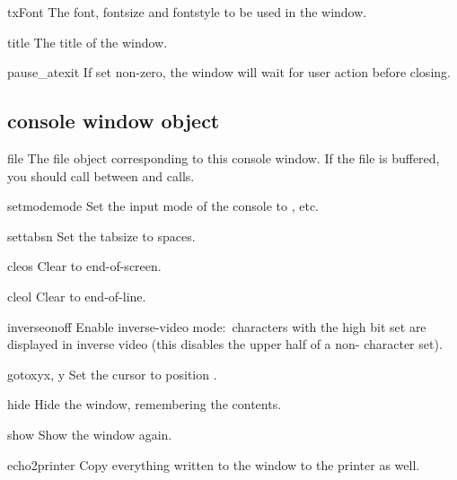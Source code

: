 \begin{datadesc}{txFont}
The font, fontsize and fontstyle to be used in the window.
\end{datadesc}

\begin{datadesc}{title}
The title of the window.
\end{datadesc}

\begin{datadesc}{pause_atexit}
If set non-zero, the window will wait for user action before closing.
\end{datadesc}

\subsection{console window object}


\begin{datadesc}{file}
The file object corresponding to this console window. If the file is
buffered, you should call  between
 and  calls.
\end{datadesc}


\begin{funcdesc}{setmode}{mode}
Set the input mode of the console to , etc.
\end{funcdesc}

\begin{funcdesc}{settabs}{n}
Set the tabsize to  spaces.
\end{funcdesc}

\begin{funcdesc}{cleos}{}
Clear to end-of-screen.
\end{funcdesc}

\begin{funcdesc}{cleol}{}
Clear to end-of-line.
\end{funcdesc}

\begin{funcdesc}{inverse}{onoff}
Enable inverse-video mode:\ characters with the high bit set are
displayed in inverse video (this disables the upper half of a
non-\ASCII{} character set).
\end{funcdesc}

\begin{funcdesc}{gotoxy}{x, y}
Set the cursor to position .
\end{funcdesc}

\begin{funcdesc}{hide}{}
Hide the window, remembering the contents.
\end{funcdesc}

\begin{funcdesc}{show}{}
Show the window again.
\end{funcdesc}

\begin{funcdesc}{echo2printer}{}
Copy everything written to the window to the printer as well.
\end{funcdesc}
